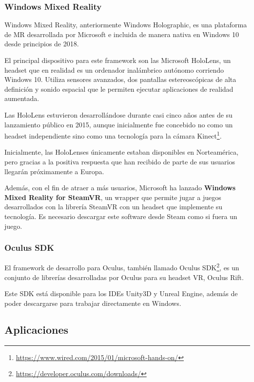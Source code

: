 \subsubsection{Windows Mixed Reality}

Windows Mixed Reality, anteriormente Windows Holographic, es una plataforma de \acs{MR} desarrollada por Microsoft e incluida de manera nativa en Windows 10 desde principios de 2018.

El principal dispositivo para este framework son las Microsoft HoloLens, un headset que en realidad es un ordenador inalámbrico autónomo corriendo Windows 10. Utiliza sensores avanzados, dos pantallas estereoscópicas de alta definición y sonido espacial que le permiten ejecutar aplicaciones de realidad aumentada.

Las HoloLens estuvieron desarrollándose durante casi cinco años antes de su lanzamiento público en 2015, aunque inicialmente fue concebido no como un headset independiente sino como una tecnología para la cámara Kinect\footnote{\url{https://www.wired.com/2015/01/microsoft-hands-on/}}.

Inicialmente, las HoloLenses únicamente estaban disponibles en Norteamérica, pero gracias a la positiva respuesta que han recibido de parte de sus usuarios llegarán próximamente a Europa.

Además, con el fin de atraer a más usuarios, Microsoft ha lanzado \textbf{Windows Mixed Reality for SteamVR}, un wrapper que permite jugar a juegos desarrollados con la librería SteamVR con un headset que implemente su tecnología. Es necesario descargar este software desde Steam como si fuera un juego.

\subsubsection{Oculus SDK}

El framework de desarrollo para Oculus, también llamado Oculus SDK\footnote{\url{https://developer.oculus.com/downloads/}}, es un conjunto de librerías desarrolladas por Oculus para su headset \acs{VR}, Oculus Rift.

Este \acs{SDK} está disponible para los IDEs Unity3D y Unreal Engine, además de poder descargarse para trabajar directamente en Windows.
    

\subsection{Aplicaciones}

